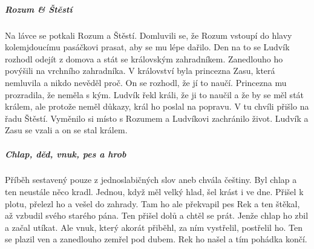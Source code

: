 {{\subparagraph{Rozum \& Štěstí}
	Na lávce se potkali Rozum a Štěstí. Domluvili se, že Rozum vstoupí do hlavy
	kolemjdoucímu pasáčkovi prasat, aby se mu lépe dařilo. Den na to se Ludvík
	rozhodl odejít z domova a stát se královským zahradníkem. Zanedlouho ho
	povýšili na vrchního zahradníka. V království byla princezna Zasu, která
	nemluvila a nikdo nevěděl proč. On se rozhodl, že jí to naučí. Princezna mu
	prozradila, že neměla s kým. Ludvík řekl králi, že ji to naučil a že by se měl
	stát králem, ale protože neměl důkazy, král ho poslal na popravu. V tu chvíli
	přišlo na řadu Štěstí. Vyměnilo si místo s Rozumem a Ludvíkovi zachránilo
	život. Ludvík a Zasu se vzali a on se stal králem.

\subparagraph{Chlap, děd, vnuk, pes a hrob}
	Příběh sestavený pouze z jednoslabičných slov aneb chvála češtiny. Byl
	chlap a ten neustále něco kradl. Jednou, když měl velký hlad, šel krást i
	ve dne. Přišel k plotu, přelezl ho a vešel do zahrady. Tam ho ale překvapil
	pes Rek a ten štěkal, až vzbudil svého starého pána. Ten přišel dolů a
	chtěl se prát. Jenže chlap ho zbil a začal utíkat. Ale vnuk, který akorát
	přiběhl, za ním vystřelil, postřelil ho. Ten se plazil ven a zanedlouho
	zemřel pod dubem. Rek ho našel a tím pohádka končí.
}


\newpart


\newpart




}

